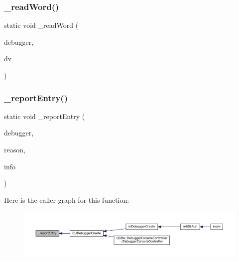\mbox{\label{debugger_2cli-debugger_8c_abb342e8169f294b6f362d32712732c68}} 
\subsubsection{\texorpdfstring{\+\_\+read\+Word()}{\_readWord()}}
{\footnotesize\ttfamily static void \+\_\+read\+Word (\begin{DoxyParamCaption}\item[{struct C\+L\+I\+Debugger $\ast$}]{debugger,  }\item[{struct C\+L\+I\+Debug\+Vector $\ast$}]{dv }\end{DoxyParamCaption})\hspace{0.3cm}{\ttfamily [static]}}

\mbox{\label{debugger_2cli-debugger_8c_a12aa54a009f9bc0715f9a506c13a3ce8}} 
\subsubsection{\texorpdfstring{\+\_\+report\+Entry()}{\_reportEntry()}}
{\footnotesize\ttfamily static void \+\_\+report\+Entry (\begin{DoxyParamCaption}\item[{struct m\+Debugger $\ast$}]{debugger,  }\item[{enum m\+Debugger\+Entry\+Reason}]{reason,  }\item[{struct m\+Debugger\+Entry\+Info $\ast$}]{info }\end{DoxyParamCaption})\hspace{0.3cm}{\ttfamily [static]}}

Here is the caller graph for this function\+:
\nopagebreak
\begin{figure}[H]
\begin{center}
\leavevmode
\includegraphics[width=350pt]{debugger_2cli-debugger_8c_a12aa54a009f9bc0715f9a506c13a3ce8_icgraph}
\end{center}
\end{figure}
\mbox{\label{debugger_2cli-debugger_8c_ab05ea35fc2d35b4a05bad6c08c1d8336}} 
